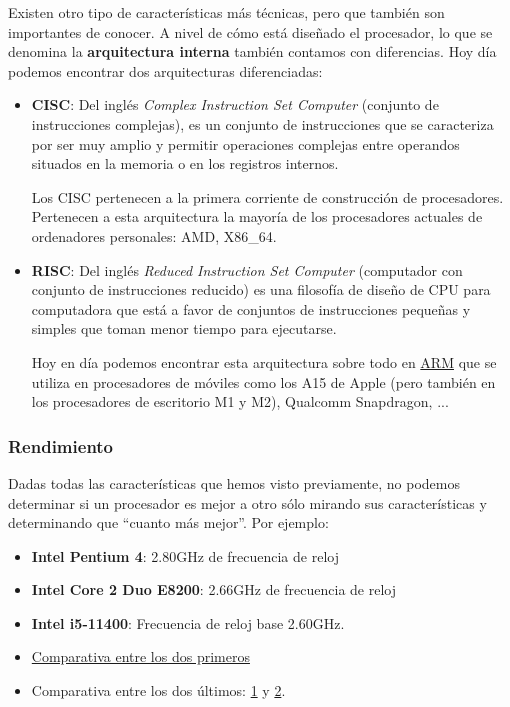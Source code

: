 Existen otro tipo de características más técnicas, pero que también son importantes de conocer. A nivel de cómo está diseñado el procesador, lo que se denomina la \textbf{arquitectura interna} también contamos con diferencias. Hoy día podemos encontrar dos arquitecturas diferenciadas:
\begin{itemize}
    \item \textbf{CISC}: Del inglés \textit{Complex Instruction Set Computer} (conjunto de instrucciones complejas), es un conjunto de instrucciones  que se caracteriza por ser muy amplio y permitir operaciones complejas entre operandos situados en la memoria o en los registros internos.

    Los CISC pertenecen a la primera corriente de construcción de procesadores. Pertenecen a esta arquitectura la mayoría de los procesadores actuales de ordenadores personales: AMD, X86\_64.

    \item \textbf{RISC}: Del inglés \textit{Reduced Instruction Set Computer} (computador con conjunto de instrucciones reducido) es una filosofía de diseño de CPU para computadora que está a favor de conjuntos de instrucciones pequeñas y simples que toman menor tiempo para ejecutarse.

    Hoy en día podemos encontrar esta arquitectura sobre todo en \href{https://es.wikipedia.org/wiki/Arquitectura_ARM}{ARM} que se utiliza en procesadores de móviles como los A15 de Apple (pero también en los procesadores de escritorio M1 y M2), Qualcomm Snapdragon, ...

\end{itemize}



\subsubsection{Rendimiento}
Dadas todas las características que hemos visto previamente, no podemos determinar si un procesador es mejor a otro sólo mirando sus características y determinando que “cuanto más mejor”. Por ejemplo:

\begin{itemize}
    \item \textbf{Intel Pentium 4}: 2.80GHz de frecuencia de reloj
    \item \textbf{Intel Core 2 Duo E8200}: 2.66GHz de frecuencia de reloj
    \item \textbf{Intel i5-11400}: Frecuencia de reloj base 2.60GHz.
    \item \href{https://cpu.userbenchmark.com/Compare/Intel-Pentium-4-280GHz-vs-Intel-Core2-Duo-E8200/m3163vsm3200}{Comparativa entre los dos primeros}
    \item Comparativa entre los dos últimos: \href{https://cpu.userbenchmark.com/Compare/Intel-Core-i5-11400-vs-Intel-Core2-Duo-E8200/4112vsm3200}{1} y \href{https://www.cpu-monkey.com/es/compare_cpu-intel_core_i5_11400-vs-intel_core2_duo_e8200}{2}.
\end{itemize}

